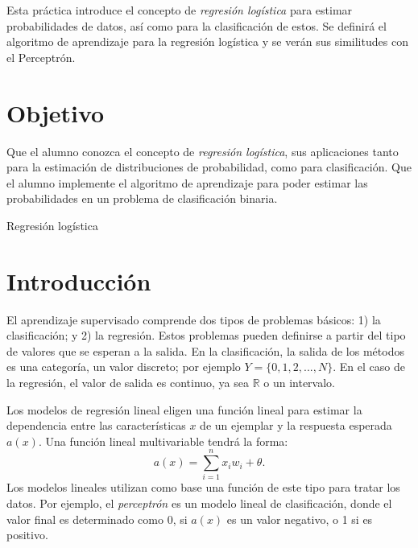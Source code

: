 
Esta práctica introduce el concepto de \emph{regresión logística} para estimar probabilidades de datos, así como para la clasificación de estos. Se definirá el algoritmo de aprendizaje para la regresión logística y se verán sus similitudes con el Perceptrón.


\section{Objetivo}

Que el alumno conozca el concepto de \textit{regresión logística}, sus aplicaciones tanto para la estimación de distribuciones de probabilidad, como para clasificación. Que el alumno implemente el algoritmo de aprendizaje para poder estimar las probabilidades en un problema de clasificación binaria.

\begin{auxcode}
 \caption{Regresión logística}
 \centering
\end{auxcode}


\section{Introducción}

El aprendizaje supervisado comprende dos tipos de problemas básicos: 1) la clasificación; y 2) la regresión. Estos problemas pueden definirse a partir del tipo de valores que se esperan a la salida. En la clasificación, la salida de los métodos es una categoría, un valor discreto; por ejemplo $Y = \{0,1,2,...,N\}$. En el caso de la regresión, el valor de salida es continuo, ya sea $\mathbb{R}$ o un intervalo.

Los modelos de regresión lineal eligen una función lineal para estimar la dependencia entre las características $x$ de un ejemplar y la respuesta esperada $a(x)$. Una función lineal multivariable tendrá la forma: $$a(x) = \sum_{i=1}^n x_iw_i + \theta.$$
Los modelos lineales utilizan como base una función de este tipo para tratar los datos. Por ejemplo, el \textit{perceptrón} es un modelo lineal de clasificación, donde el valor final es determinado como 0, si $a(x)$ es un valor negativo, o 1 si es positivo.



